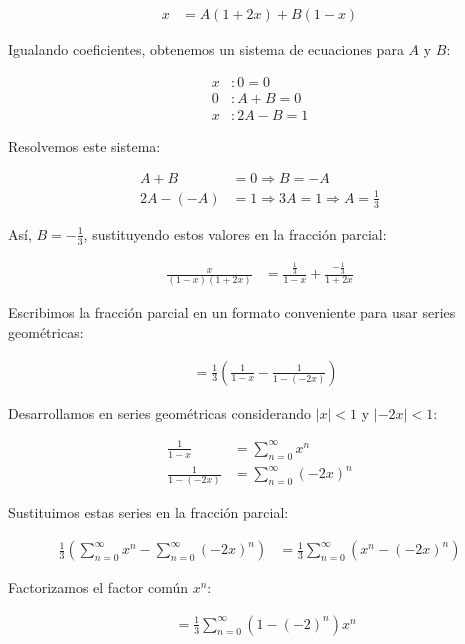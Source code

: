 \documentclass{article}
\begin{document}
    \begin{align*}
    x &= A(1+2x) + B(1-x)
    \end{align*}

    Igualando coeficientes, obtenemos un sistema de ecuaciones para $A$ y $B$:

    \begin{align*}
    x & : 0 = 0 \\
    0 & : A + B = 0 \\
    x & : 2A - B = 1
    \end{align*}

    Resolvemos este sistema:

    \begin{align*}
    A + B &= 0 \Rightarrow B = -A \\
    2A - (-A) &= 1 \Rightarrow 3A = 1 \Rightarrow A = \frac{1}{3}
    \end{align*}

    Así, $B = -\frac{1}{3}$, sustituyendo estos valores en la fracción parcial:

    \begin{align*}
    \frac{x}{(1-x)(1+2 x)}
    &= \frac{\frac{1}{3}}{1-x} + \frac{-\frac{1}{3}}{1+2 x}
    \end{align*}

    Escribimos la fracción parcial en un formato conveniente para usar series geométricas:

    \begin{align*}
    &= \frac{1}{3}\left(\frac{1}{1-x} - \frac{1}{1-(-2x)}\right)
    \end{align*}

    Desarrollamos en series geométricas considerando $|x| < 1$ y $|-2x| < 1$:

    \begin{align*}
    \frac{1}{1-x} &= \sum_{n=0}^{\infty} x^n \\
    \frac{1}{1-(-2x)} &= \sum_{n=0}^{\infty} (-2x)^n
    \end{align*}

    Sustituimos estas series en la fracción parcial:

    \begin{align*}
    \frac{1}{3}\left( \sum_{n=0}^{\infty} x^n - \sum_{n=0}^{\infty} (-2x)^n \right)
    &= \frac{1}{3} \sum_{n=0}^{\infty} (x^n - (-2x)^n)
    \end{align*}

    Factorizamos el factor común $x^n$:

    \begin{align*}
    &= \frac{1}{3} \sum_{n=0}^{\infty} \left(1 - (-2)^n \right) x^n
    \end{align*}
\end{document}
